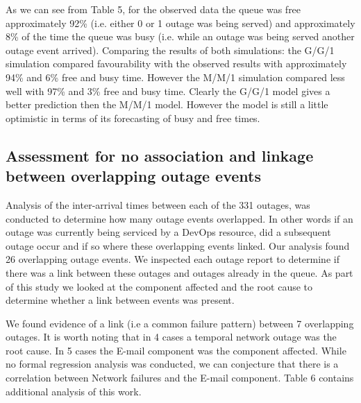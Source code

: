 \documentclass[5p]{elsarticle}
\begin{document}
As we can see from Table 5, for the observed data the queue was free approximately 92\% (i.e. either 0 or 1 outage was being served) and approximately 8\% of the time the queue was busy (i.e. while an outage was being served another outage event arrived). Comparing the results of both simulations: the G/G/1 simulation compared favourability with the observed results with approximately 94\% and 6\% free and busy time. However the M/M/1 simulation compared less well with 97\% and 3\% free and busy time. Clearly the G/G/1 model gives a better prediction then the M/M/1 model. However the model is still a little optimistic in terms of its forecasting of busy and free times.

\subsection{Assessment for no association and linkage between overlapping outage events}

Analysis of the inter-arrival times between each of the 331 outages, was conducted to determine how many outage events overlapped. In other words if an outage was currently being serviced by a DevOps resource, did a subsequent outage occur and if so where these overlapping events linked. Our analysis found 26 overlapping outage events. We inspected each outage report to determine if there was a link between these outages and outages already in the queue. As part of this study we looked at the component affected and the root cause to determine whether a link between events was present. 

We found evidence of a link (i.e a common failure pattern) between 7 overlapping outages. It is worth noting that in 4 cases a temporal network outage was the root cause. In 5 cases the E-mail component was the component affected. While no formal regression analysis was conducted, we can conjecture that there is a correlation between Network failures and the E-mail component. Table 6 contains additional analysis of this work.
\end{document}
